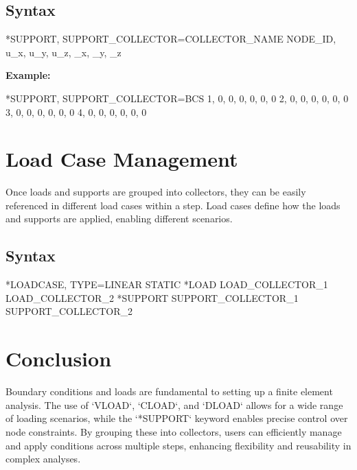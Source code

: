 \subsection{Syntax}
\begin{codeBlock}
*SUPPORT, SUPPORT_COLLECTOR=COLLECTOR_NAME
NODE_ID, u_x, u_y, u_z, \theta_x, \theta_y, \theta_z
\end{codeBlock}

\textbf{Example:}
\begin{codeBlock}
*SUPPORT, SUPPORT_COLLECTOR=BCS
1, 0, 0, 0, 0, 0, 0
2, 0, 0, 0, 0, 0, 0
3, 0, 0, 0, 0, 0, 0
4, 0, 0, 0, 0, 0, 0
\end{codeBlock}

\section{Load Case Management}

Once loads and supports are grouped into collectors, they can be easily referenced in different load cases within a step.
Load cases define how the loads and supports are applied, enabling different scenarios.

\subsection{Syntax}
\begin{codeBlock}
*LOADCASE, TYPE=LINEAR STATIC
*LOAD
LOAD_COLLECTOR_1
LOAD_COLLECTOR_2
*SUPPORT
SUPPORT_COLLECTOR_1
SUPPORT_COLLECTOR_2
\end{codeBlock}

\section{Conclusion}

Boundary conditions and loads are fundamental to setting up a finite element analysis.
The use of `VLOAD`, `CLOAD`, and `DLOAD` allows for a wide range of loading scenarios,
while the `*SUPPORT` keyword enables precise control over node constraints.
By grouping these into collectors, users can efficiently manage and apply conditions across multiple steps,
enhancing flexibility and reusability in complex analyses.
